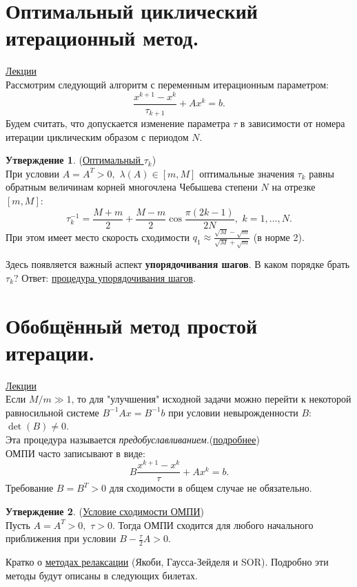 \documentclass[specialist, subf, href, colorlinks=true, 12pt, times, mtpro, final]{disser}
\theoremstyle{definition}
\newtheorem{state}{Утверждение}[section]
\begin{document}
{\section {Оптимальный циклический итерационный метод.}
    \hyperlink {lects.61}{Лекции}\\
    Рассмотрим следующий алгоритм с переменным итерационным параметром:
    $$
        \frac{x^{k+1} - x^{k}}{\tau_{k+1}} + Ax^{k} = b.
    $$
    Будем считать, что допускается изменение параметра $\tau$ в зависимости от номера итерации циклическим образом с периодом $N$.
    \begin{state} (\hyperlink {lects.61}{Оптимальный $\tau_{k}$})\\
    При условии $A = A^T > 0, \,\, \lambda(A) \in [m, M]$ оптимальные значения $\tau_k$
    равны обратным величинам корней многочлена Чебышева степени $N$ на отрезке $[m, M]$:
    $$
    \tau_k^{-1} = \frac{M+m}{2} + \frac{M-m}{2}\cos\frac{\pi(2k-1)}{2N}, \,\, k = 1,...,N.
    $$
    При этом имеет место скорость сходимости
    $q_1 \approx \frac{\sqrt{M}-\sqrt{m}}{\sqrt{M}+\sqrt{m}}$ (в норме 2).
    \end{state}
    Здесь появляется важный аспект {\bf упорядочивания шагов}. В каком порядке брать $\tau_k$?
    Ответ: \hyperlink {lects.62}{процедура упорядочивания шагов}.

\section {Обобщённый метод простой итерации.}
    \hyperlink {lects.63}{Лекции}\\
    Если $M/m \gg 1$, то для "улучшения"{} исходной задачи можно перейти к некоторой равносильной системе $B^{-1}Ax = B^{-1}b$ при условии невырожденности $B$:
    $\det(B) \ne 0$.\\
    Эта процедура называется {\it предобуславливанием}.(\hyperlink {lects.63}{подробнее})\\
    ОМПИ часто записывают в виде:
    $$
        B\frac{x^{k+1} - x^{k}}{\tau} + Ax^{k} = b.
    $$
    Требование $B = B^T > 0$ для сходимости в общем случае не обязательно.
    \begin{state} (\hyperlink {lects.63}{Условие сходимости ОМПИ})\\
    Пусть $A = A^T > 0, \,\, \tau > 0$. Тогда ОМПИ сходится для любого начального
    приближения при условии $B - \frac{\tau}{2}A > 0$.
    \end{state}
    Кратко о \hyperlink {lects.64}{методах релаксации} (Якоби, Гаусса-Зейделя и SOR).
    Подробно эти методы будут описаны в следующих билетах.

}
\end{document}
